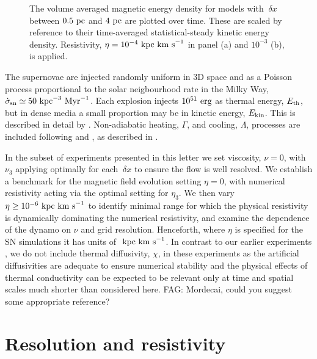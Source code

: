 \documentclass[preprint2]{aastex63}
\newcommand\SNr{\dot\sigma_{\rm sn}}
\newcommand\ESK{E_{\rm kin}}
\newcommand\EST{E_{\rm th}}
\newcommand\kpc{~ {\rm kpc}}
\newcommand\pc{~ {\rm pc}}
\newcommand\dx{~ {\delta x}}
\newcommand\Myr{~ {\rm Myr}}
\newcommand\erg{~ {\rm erg}}
\newcommand\kms{~ {\rm km~ s}^{-1}}
\newcommand{\fag}[1]{\textcolor{midgreen}{FAG: #1}}
\begin{document}
\begin{figure*}
\caption{
The volume averaged magnetic energy density for models with $\dx$
between $0.5\pc$ and $4\pc$ are plotted over time.
These are scaled by reference to their
 time-averaged statistical-steady kinetic energy density.
Resistivity, $\eta=10^{-4}\kpc\kms$ in panel {\rm(a)} and $10^{-3}$
{\rm(b)}, is applied.
\label{fig:eb-res}}
\end{figure*}

The supernovae are injected randomly uniform in 3D space and as a
Poisson process proportional to the solar neigbourhood rate in the Milky Way,
 $\SNr\simeq 50\kpc^{-3}\Myr^{-1}$. 
Each explosion injects $10^{51}\erg$ as thermal energy, $\EST$, but in 
dense media a small proportion may be in kinetic energy, $\ESK$.
This is described in detail by \citet{GMKSH20}.
Non-adiabatic heating, $\Gamma$, and cooling, $\Lambda$, processes are included
following \citet{Wolfire:1995} and \citet{Sarazin:1987}, as described in 
\citet{Gent:2013a}. 

In the subset of experiments presented in this letter we set viscosity, $\nu=0$,
with $\nu_3$ applying optimally for each $\dx$ to ensure the flow is 
well resolved.
We establish a benchmark for the magnetic field evolution setting $\eta=0$, with
numerical resistivity acting via the optimal setting for $\eta_3$.
We then vary $\eta\geq10^{-6}\kpc\kms$ to identify minimal range for which the physical
resistivity is dynamically dominating the numerical resistivity, and examine the
dependence of the dynamo on $\nu$ and grid resolution.
Henceforth, where $\eta$ is specified for the SN simulations it has units of $\kpc\kms$. 
In contrast to our earlier experiments \citep{Gent:2013a,Gent:2013b,GMKSH20},
we do not include thermal diffusivity, $\chi$, in these experiments as 
the artificial diffusivities are adequate to ensure numerical stability and
the physical effects of thermal conductivity can be expected to be relevant only
at time and spatial scales much shorter than considered here.
\fag{Mordecai, could you suggest some appropriate reference?}

\section{Resolution and resistivity} \label{sec:results}
\end{document}
